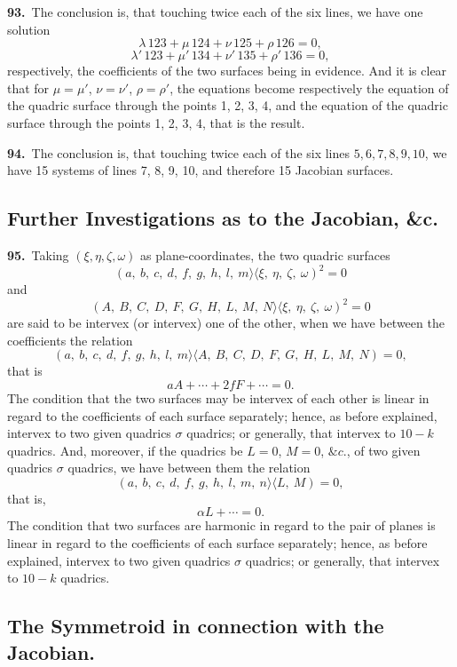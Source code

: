 \documentclass[11pt,a4paper]{article}
\newcommand{\bw}{\mathrel{\rangle\!\langle}}
\begin{document}
\medskip

\textbf{93.}\ The conclusion is, that touching twice each of the six lines, we have one solution
\[
\lambda\,123 + \mu\,124 + \nu\,125 + \rho\,126 = 0,
\]
\[
\lambda'\,123 + \mu'\,134 + \nu'\,135 + \rho'\,136 = 0,
\]
respectively, the coefficients of the two surfaces being in evidence. And it is clear that for $\mu = \mu'$, $\nu = \nu'$, $\rho = \rho'$, the equations become respectively the equation of the quadric surface through the points 1, 2, 3, 4, and the equation of the quadric surface through the points 1, 2, 3, 4, that is the result.

\medskip

\textbf{94.}\ The conclusion is, that touching twice each of the six lines $5, 6, 7, 8, 9, 10$, we have 15 systems of lines 7, 8, 9, 10, and therefore 15 Jacobian surfaces.

\newpage
\setcounter{page}{171}

\subsection*{Further Investigations as to the Jacobian, \&c.}

\noindent\textbf{95.}\ Taking $(\xi, \eta, \zeta, \omega)$ as plane-coordinates, the two quadric surfaces
\[
(a,\ b,\ c,\ d,\ f,\ g,\ h,\ l,\ m \bw\xi,\ \eta,\ \zeta,\ \omega)^2 = 0
\]
and
\[
(A,\ B,\ C,\ D,\ F,\ G,\ H,\ L,\ M,\ N \bw\xi,\ \eta,\ \zeta,\ \omega)^2 = 0
\]
are said to be intervex (or intervex) one of the other, when we have between the coefficients the relation
\[
(a,\ b,\ c,\ d,\ f,\ g,\ h,\ l,\ m \bw A,\ B,\ C,\ D,\ F,\ G,\ H,\ L,\ M,\ N) = 0,
\]
that is
\[
aA + \cdots + 2fF + \cdots = 0.
\]
The condition that the two surfaces may be intervex of each other is linear in regard to the coefficients of each surface separately; hence, as before explained, intervex to two given quadrics $\sigma$ quadrics; or generally, that intervex to $10 - k$ quadrics. And, moreover, if the quadrics be $L = 0$, $M = 0$, $\&c.$, of two given quadrics $\sigma$ quadrics, we have between them the relation
\[
(a,\ b,\ c,\ d,\ f,\ g,\ h,\ l,\ m,\ n \bw L,\ M) = 0,
\]
that is,
\[
\alpha L + \cdots = 0.
\]
The condition that two surfaces are harmonic in regard to the pair of planes is linear in regard to the coefficients of each surface separately; hence, as before explained, intervex to two given quadrics $\sigma$ quadrics; or generally, that intervex to $10 - k$ quadrics.

\subsection*{The Symmetroid in connection with the Jacobian.}
\end{document}
